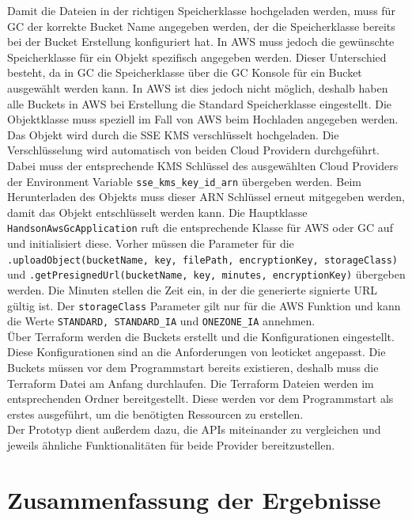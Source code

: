 Damit die Dateien in der richtigen Speicherklasse hochgeladen werden, muss für GC der korrekte Bucket Name angegeben werden, der die Speicherklasse bereits bei der Bucket Erstellung konfiguriert hat. In AWS muss jedoch die gewünschte Speicherklasse für ein Objekt spezifisch angegeben werden. Dieser Unterschied besteht, da in GC die Speicherklasse über die GC Konsole für ein Bucket ausgewählt werden kann. In AWS ist dies jedoch nicht möglich, deshalb haben alle Buckets in AWS bei Erstellung die Standard Speicherklasse eingestellt. Die Objektklasse muss speziell im Fall von AWS beim Hochladen angegeben werden.\\ 

Das Objekt wird durch die SSE KMS verschlüsselt hochgeladen. Die Verschlüsselung wird automatisch von beiden Cloud Providern durchgeführt. Dabei muss der entsprechende KMS Schlüssel des ausgewählten Cloud Providers der Environment Variable \verb|sse_kms_key_id_arn| übergeben werden. Beim Herunterladen des Objekts muss dieser ARN Schlüssel erneut mitgegeben werden, damit das Objekt entschlüsselt werden kann. Die Hauptklasse \verb|HandsonAwsGcApplication| ruft die entsprechende Klasse für AWS oder GC auf und initialisiert diese. Vorher müssen die Parameter für die \verb|.uploadObject(bucketName, key, filePath, encryptionKey, storageClass)| und \verb|.getPresignedUrl(bucketName, key, minutes, encryptionKey)| übergeben werden. Die Minuten stellen die Zeit ein, in der die generierte signierte URL gültig ist. Der \verb|storageClass| Parameter gilt nur für die AWS Funktion und kann die Werte \verb|STANDARD, STANDARD_IA| und \verb|ONEZONE_IA| annehmen.\\

Über Terraform werden die Buckets erstellt und die Konfigurationen eingestellt. Diese Konfigurationen sind an die Anforderungen von leoticket angepasst. Die Buckets müssen vor dem Programmstart bereits existieren, deshalb muss die Terraform Datei am Anfang durchlaufen. Die Terraform Dateien werden im entsprechenden Ordner bereitgestellt. Diese werden vor dem Programmstart als erstes ausgeführt, um die benötigten Ressourcen zu erstellen.\\

Der Prototyp dient außerdem dazu, die APIs miteinander zu vergleichen und jeweils ähnliche Funktionalitäten für beide Provider bereitzustellen.

\newpage

\section{Zusammenfassung der Ergebnisse}

